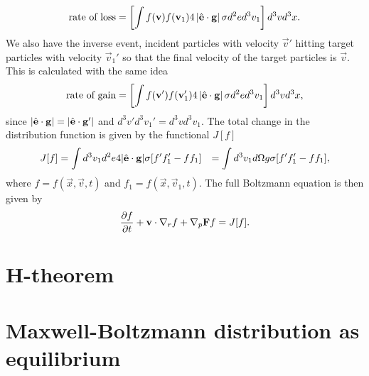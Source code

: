 \begin{align}
	\text{rate of loss} = \left[\int f(\mathbf v)f(\mathbf v_1)4\left|\hat {\mathbf{e}} \cdot \mathbf g \right|\sigma d^2 ed^3 v_1\right]d^3 vd^3 x.
\end{align}
We also have the inverse event, incident particles with velocity $\vec v'$ hitting target particles with velocity $\vec v_1'$ so that the final velocity of the target particles is $\vec v$. This is calculated with the same idea
\begin{align}
	\text{rate of gain} = \left[\int f(\mathbf v')f(\mathbf v_1')4\left|\hat {\mathbf{e}} \cdot \mathbf g \right|\sigma d^2 ed^3 v_1\right]d^3 vd^3 x,
\end{align}
since $|\hat {\mathbf{e}}\cdot \mathbf g| = |\hat {\mathbf{e}}\cdot \mathbf g'|$ and $d^3 v'd^3 v_1' = d^3 vd^3 v_1$. The total change in the distribution function is given by the functional $J[f]$
\begin{align}
	J[f] &= \int d^3 v_1 d^2 e4|\hat {\mathbf{e}}\cdot\mathbf g|\sigma[f'f_1' - ff_1]
	&= \int d^3 v_1 d\Omega g \sigma[f'f_1' - ff_1],
\end{align}
where $f = f(\vec x, \vec v, t)$ and $f_1 = f(\vec x, \vec v_1, t)$. The full Boltzmann equation is then given by
\begin{align}
	\label{eq:boltzmann_equation}
	\frac{\partial f}{\partial t} + \mathbf v\cdot \nabla_r f + \nabla_p \mathbf F f = J[f].
\end{align}
\section{H-theorem}
\section{Maxwell-Boltzmann distribution as equilibrium}

